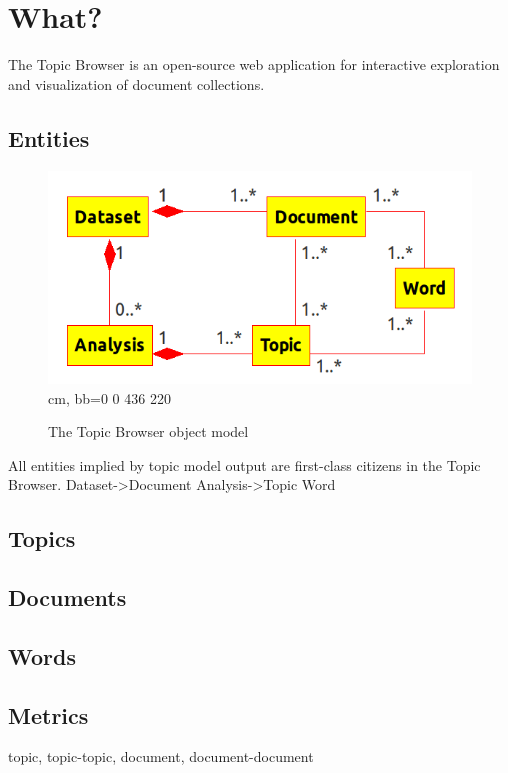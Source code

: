 \documentclass[a4paper,10pt]{article}
\begin{document}
\section{What?}
The Topic Browser is an open-source web application for interactive exploration
and visualization of document collections. 

\subsection{Entities}
\begin{figure}[ht]
 \centering
 \includegraphics{topic_browser_object_model_transparent.png}
cm, bb=0 0 436 220
 \caption{The Topic Browser object model}
 \label{fig:object_model}
\end{figure}



All entities implied by topic model output are first-class citizens in the Topic
Browser. 
Dataset->Document
Analysis->Topic
Word

\subsection{Topics}

\subsection{Documents}

\subsection{Words}

\subsection{Metrics}
topic, topic-topic, document, document-document
\end{document}
